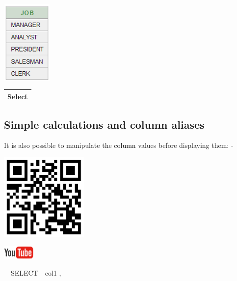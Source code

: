 \begin{center}
  
\includegraphics[width=2.491cm,height=4.124cm]{images/img (21).png}

\end{center}
\begin{flushleft}
\tablefirsthead{}
\tablehead{}
\tabletail{}
\tablelasttail{}
\begin{supertabular}{|m{11.537001cm}|}
\hline
Select 

\\\hline
\end{supertabular}
\end{flushleft}
\subsection{Simple calculations and column aliases}
It is also possible to manipulate the column values before displaying them: -



\begin{center}
\begin{minipage}{4.849cm}
   
\includegraphics[width=4.314cm,height=4.314cm]{images/img (22).png}
 

   
\includegraphics[width=1.582cm,height=0.674cm]{images/img (15).png}
 
\end{minipage}
\end{center}
\ \ SELECT\ \ col1 ,

